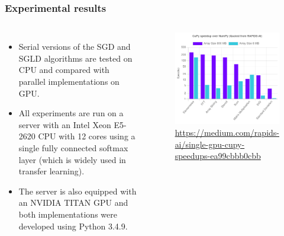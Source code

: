 \documentclass[10pt,a4paper]{beamer}
\begin{document}
\begin{frame}\frametitle{Experimental results}

\begin{columns}
	\begin{itemize}
		\item Serial versions of the SGD and SGLD algorithms are tested on CPU and compared with parallel
		implementations on GPU.
		\item All experiments are run on a server with an Intel Xeon E5-2620 CPU
		with 12 cores using a single fully connected softmax layer (which is widely used in transfer learning).
		\item The server is also equipped with an NVIDIA TITAN GPU and both implementations were developed
		using Python 3.4.9.
	\end{itemize}
	\begin{figure}
		\centering
		\includegraphics[width=\linewidth]{figures/cupy_numpy}
		\caption{\scriptsize{\url{https://medium.com/rapids-ai/single-gpu-cupy-speedups-ea99cbbb0cbb}}}
	\end{figure}
	
\end{columns}
\end{frame}
\end{document}
